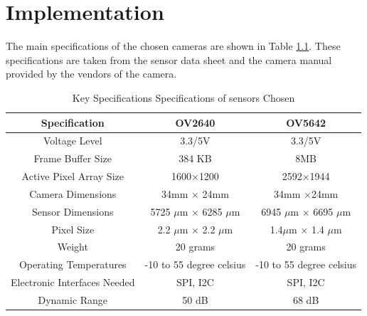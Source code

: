 \chapter{Implementation}

The main specifications of the chosen cameras are shown in Table \ref{tbl:camera_specs}. These specifications are taken from the sensor data sheet and the camera manual provided by the vendors of the camera\cite{OV2640Arducam}\cite{OV5642Arducam}\cite{OV2640DS}\cite{OV5642DS}.
\begin{table}[]
\centering
\caption{ Key Specifications Specifications of sensors Chosen}
\label{tbl:camera_specs}
\begin{tabular}{|c|c|c|}
\hline
Specification & OV2640 &  OV5642 \\
\hline
Voltage Level & 3.3/5V &  3.3/5V\\
 \hline
Frame Buffer Size & 384 KB & 8MB \\
 \hline
 Active Pixel Array Size& 1600$\times$1200&  2592$\times$1944 \\
 \hline  
 Camera Dimensions & 34mm $\times$ 24mm & 34mm $\times$24mm\\
 \hline
 Sensor Dimensions & 5725 $\mu$m $\times$ 6285 $\mu$m& 6945 $\mu$m $\times$ 6695 $\mu$m\\
 \hline
 Pixel Size & 2.2 $\mu$m $\times$ 2.2 $\mu$m & 1.4$\mu$m $\times$ 1.4 $\mu$m\\
 \hline
 Weight & 20 grams & 20 grams \\
 \hline
 Operating Temperatures & -10 to 55 degree celsius & -10 to 55 degree celsius \\
 \hline
 Electronic Interfaces Needed & SPI, I2C & SPI, I2C\\
 \hline
 Dynamic Range & 50 dB & 68 dB \\
 \hline
\end{tabular}
\end{table}
